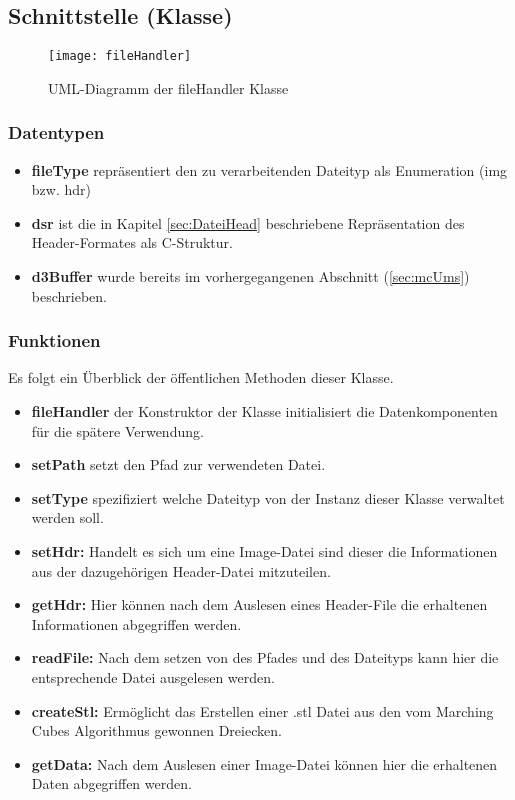 \subsection{Schnittstelle (Klasse)}
\begin{figure}[H]
	\centering
	\texttt{[image: fileHandler]}
	\caption{UML-Diagramm der fileHandler Klasse}
	\label{fig:fileHandler}
\end{figure}
\subsubsection{Datentypen}
\begin{itemize}
	\item \textbf{fileType} repräsentiert den zu verarbeitenden Dateityp als Enumeration (img bzw. hdr) 
	\item \textbf{dsr} ist die in Kapitel \ref{sec:DateiHead} beschriebene Repräsentation des Header-Formates als C-Struktur.
	\item \textbf{d3Buffer} wurde bereits im vorhergegangenen Abschnitt (\ref{sec:mcUms}) beschrieben.
\end{itemize}
\subsubsection{Funktionen}
Es folgt ein Überblick der öffentlichen Methoden dieser Klasse.
\begin{itemize}
	\item \textbf{fileHandler} der Konstruktor der Klasse initialisiert die Datenkomponenten für die spätere Verwendung.
	\item \textbf{setPath} setzt den Pfad zur verwendeten Datei.
	\item \textbf{setType} spezifiziert welche Dateityp von der Instanz dieser Klasse verwaltet werden soll.
	\item \textbf{setHdr:} Handelt es sich um eine Image-Datei sind dieser die Informationen aus der dazugehörigen Header-Datei mitzuteilen. 
	\item \textbf{getHdr:} Hier können nach dem Auslesen eines Header-File die erhaltenen Informationen abgegriffen werden. 
	\item \textbf{readFile:} Nach dem setzen von des Pfades und des Dateityps kann hier die entsprechende Datei ausgelesen werden.
	\item \textbf{createStl:} Ermöglicht das Erstellen einer .stl Datei aus den vom Marching Cubes Algorithmus gewonnen Dreiecken. 
	\item \textbf{getData:} Nach dem Auslesen einer Image-Datei können hier die erhaltenen Daten abgegriffen werden.
\end{itemize}
